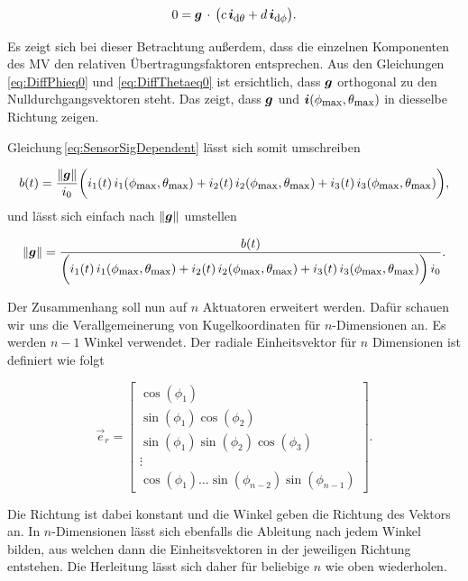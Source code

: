    \begin{equation}
      0 = \mbox{\boldmath ${g}$} \,\cdot \, \bigl( c\,\mbox{\boldmath ${i}$}_{\textrm{\footnotesize{d$\theta$}}} + d \,\mbox{\boldmath ${i}$}_{\textrm{\footnotesize{d$\phi$}}} \bigr).
   \end{equation}

   Es zeigt sich bei dieser Betrachtung außerdem, dass die einzelnen Komponenten des MV den relativen Übertragungsfaktoren entsprechen. Aus den Gleichungen\,\ref{eq:DiffPhieq0} und \ref{eq:DiffThetaeq0} ist ersichtlich, dass $\mbox{\boldmath ${g}$}$ orthogonal zu den Nulldurchgangsvektoren steht. Das zeigt, dass $\mbox{\boldmath ${g}$}$ und $\mbox{\boldmath ${i}$}(\phi_{\textrm{\footnotesize{max}}},\theta_{\textrm{\footnotesize{max}}})$ in diesselbe Richtung zeigen.

   Gleichung\,\ref{eq:SensorSigDependent} lässt sich somit umschreiben

   \begin{equation}
      b(t) = \frac{\|\mbox{\boldmath ${g}$}\|}{i_0}  \biggl(i_1(t) \,i_{1}(\phi_{\textrm{\footnotesize{max}}},\theta_{\textrm{\footnotesize{max}}}) + i_2(t) \,i_{2}(\phi_{\textrm{\footnotesize{max}}},\theta_{\textrm{\footnotesize{max}}}) + i_3(t) \,i_{3}(\phi_{\textrm{\footnotesize{max}}},\theta_{\textrm{\footnotesize{max}}})\biggr),
   \end{equation}
   und lässt sich einfach nach $\|\mbox{\boldmath ${g}$}\|$ umstellen 

   \begin{equation}
      \|\mbox{\boldmath ${g}$}\| = \frac{b(t)}{\biggl(i_1(t) \,i_{1}(\phi_{\textrm{\footnotesize{max}}},\theta_{\textrm{\footnotesize{max}}}) + i_2(t) \,i_{2}(\phi_{\textrm{\footnotesize{max}}},\theta_{\textrm{\footnotesize{max}}}) + i_3(t) \,i_{3}(\phi_{\textrm{\footnotesize{max}}},\theta_{\textrm{\footnotesize{max}}})\biggr)\,i_0}.
   \end{equation}

   Der Zusammenhang soll nun auf $n$ Aktuatoren erweitert werden. Dafür schauen wir uns die Verallgemeinerung von Kugelkoordinaten für $n$-Dimensionen an. Es werden $n-1$ Winkel verwendet. Der radiale Einheitsvektor für $n$ Dimensionen ist definiert wie folgt \cite{campos_hyperspherical_2020}
   

   \begin{equation}
      \vec{e}_r =  \left[\begin{array}{c} \cos(\phi_1) \\ \sin(\phi_1)\cos(\phi_2 )\\ \sin(\phi_1)\sin(\phi_2 )\cos(\phi_3) \\ \vdots \\ \cos(\phi_1) \dots \sin(\phi_{n-2})\sin(\phi_{n-1}) \end{array}\right].
   \end{equation}

   Die Richtung ist dabei konstant und die Winkel geben die Richtung des Vektors an. In $n$-Dimensionen lässt sich ebenfalls die Ableitung nach jedem Winkel bilden, aus welchen dann die Einheitsvektoren in der jeweiligen Richtung entstehen. Die Herleitung lässt sich daher für beliebige $n$ wie oben wiederholen. 


